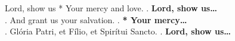 Lord, show us * Your mercy and love. \Rbar. \textbf{Lord, show us\dots}\\
\Vbar. And grant us your salvation. \Rbar. \textbf{* Your mercy\dots}\\
\Vbar. Glória Patri, et Fílio, et Spirítui Sancto. \Rbar. \textbf{Lord, show us\dots}